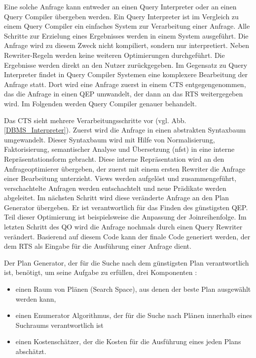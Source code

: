 Eine solche Anfrage kann entweder an einen Query Interpreter oder an einen Query Compiler übergeben werden. Ein Query Interpreter ist im Vergleich zu einem Query Compiler ein einfaches System zur Verarbeitung einer Anfrage. Alle Schritte zur Erzielung eines Ergebnisses werden in einem System ausgeführt. Die Anfrage wird zu diesem Zweck nicht kompiliert, sondern nur interpretiert. Neben Rewriter-Regeln werden keine weiteren Optimierungen durchgeführt. Die Ergebnisse werden direkt an den Nutzer zurückgegeben. Im Gegensatz zu Query Interpreter findet in Query Compiler Systemen eine komplexere Bearbeitung der Anfrage statt. Dort wird eine Anfrage zuerst in einem \ac{CTS} entgegengenommen, das die Anfrage in einen \ac{QEP} umwandelt, der dann an das \ac{RTS} weitergegeben wird. Im Folgenden werden Query Compiler genauer behandelt.






Das \ac{CTS} sieht mehrere Verarbeitungsschritte vor (vgl. Abb. \ref{DBMS_Interpreter}). Zuerst wird die Anfrage in einen abstrakten Syntaxbaum umgewandelt. Dieser Syntaxbaum wird mit Hilfe von Normalisierung, Faktorisierung, semantischer Analyse und Übersetzung (nfst) in eine interne Repräsentationsform gebracht. Diese interne Repräsentation wird an den Anfrageoptimierer übergeben, der zuerst mit einem ersten Rewriter die Anfrage einer Bearbeitung unterzieht. Views werden aufgelöst und zusammengeführt, verschachtelte Anfragen werden entschachtelt und neue Prädikate werden abgeleitet. Im nächsten Schritt wird diese veränderte Anfrage an den Plan Generator übergeben. Er ist verantwortlich für das Finden des günstigsten \ac{QEP}. Teil dieser Optimierung ist beispielsweise die Anpassung der Joinreihenfolge. Im letzten Schritt des \ac{QO} wird die Anfrage nochmals durch einen Query Rewriter verändert. Basierend auf diesem Code kann der finale Code generiert werden, der dem \ac{RTS} als Eingabe für die Ausführung einer Anfrage dient.


Der Plan Generator, der für die Suche nach dem günstigsten Plan verantwortlich ist, benötigt, um seine Aufgabe zu erfüllen, drei Komponenten \cite{chaudhuri1998overview}: 

\begin{itemize}
\item einen Raum von Plänen (Search Space), aus denen der beste Plan ausgewählt werden kann,
\item einen Enumerator Algorithmus, der für die Suche nach Plänen innerhalb eines Suchraums verantwortlich ist
\item einen Kostenschätzer, der die Kosten für die Ausführung eines jeden Plans abschätzt.
\end{itemize}
